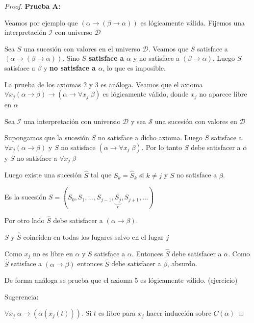 \begin{proof}

\textbf{Prueba A:}

Veamos por ejemplo que $(\alpha \rightarrow (\beta \rightarrow \alpha))$ es l\'ogicamente v\'alida. Fijemos una interpretaci\'on $\mathcal{I}$ con universo $\mathcal{D}$ 

Sea $S$ una sucesi\'on con valores en el universo $\mathcal{D}$. Veamos que $S$ satisface a $(\alpha \rightarrow (\beta \rightarrow \alpha))$. Sino \textbf{$S$ satisface a $\alpha$} y no satisface a $(\beta \rightarrow \alpha)$. Luego $S$ satisface a $\beta$ y \textbf{no satisface a $\alpha$}, lo que es imposible.

La prueba de los axiomas 2 y 3 es an\'aloga. Veamos que el axioma $\forall x_j (\alpha \rightarrow \beta) \rightarrow (\alpha \rightarrow \forall x_j \; \beta)$ es l\'ogicamente v\'alido, donde $x_j$ no aparece libre en $\alpha$

Sea $\mathcal{I}$ una interpretaci\'on con universio $\mathcal{D}$ y sea $\mathcal{S}$ una sucesi\'on con valores en $\mathcal{D}$

Supongamos que la sucesi\'on $S$ no satisface a dicho axioma. Luego $S$ satisface a $\forall x_j (\alpha \rightarrow \beta)$ y $S$ no satisface $(\alpha \rightarrow \forall x_j \; \beta)$. Por lo tanto $S$ debe satisfacer a $\alpha$ y $S$ no satisface a $\forall x_j \; \beta$

Luego existe una sucesi\'on $\hat{S}$ tal que $S_{k} = \hat{S}_k$ si $k \neq j$ y $\hat{S}$ no satisface a $\beta$. 

Es la sucesi\'on $S = (S_0, S_1, \ldots, S_{j -1}, \underbrace{S_j}_{c}, S_{j + 1}, \ldots)$

Por otro lado $\hat{S}$ debe satisfacer a $(\alpha \rightarrow \beta)$. 

$S$ y $\hat{S}$ coinciden en todas los lugares salvo en el lugar $j$

Como $x_j$ no es libre en $\alpha$ y $S$ satisface a $\alpha$. Entonces $\hat{S}$ debe satisfacer a $\alpha$. Como $\hat{S}$ satisface a $(\alpha \rightarrow \beta)$ entonces $\hat{S} $ debe satisfacer a $\beta$, absurdo.

De forma an\'aloga se prueba que el axioma 5 es l\'ogicamente v\'alido. (ejercicio)

Sugerencia:

$\forall x_j \; \alpha \rightarrow (\alpha(x_j(t)))$. Si $t$ es libre para $x_j$ hacer inducci\'on sobre $C(\alpha)$

\end{proof}

